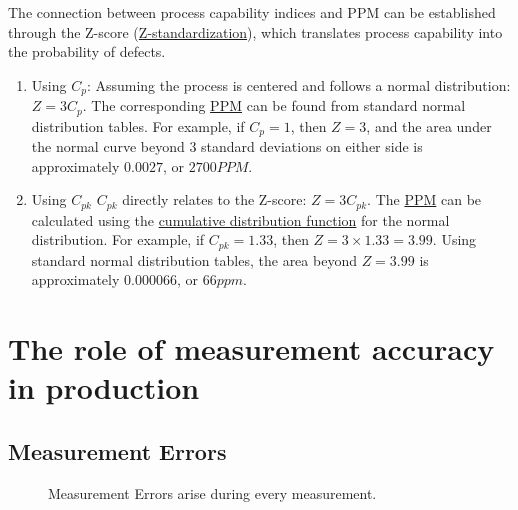 \documentclass[
  a4paper,
]{scrbook}
\begin{document}
The connection between process capability indices and PPM can be
established through the Z-score (\hyperref[Z]{Z-standardization}), which
translates process capability into the probability of defects.

\begin{enumerate}
\def\labelenumi{\arabic{enumi}.}
\item
  Using \(C_p\): Assuming the process is centered and follows a normal
  distribution: \(Z = 3C_p\). The corresponding \hyperref[ppm]{PPM} can
  be found from standard normal distribution tables. For example, if
  \(C_p = 1\), then \(Z = 3\), and the area under the normal curve
  beyond \(3\) standard deviations on either side is approximately
  \(0.0027\), or \(2700PPM\).
\item
  Using \(C_{pk}\) \(C_{pk}\) directly relates to the Z-score:
  \(Z = 3C_{pk}\). The \hyperref[ppm]{PPM} can be calculated using the
  \hyperref[cdf]{cumulative distribution function} for the normal
  distribution. For example, if \(C_{pk} = 1.33\), then
  \(Z = 3 \times 1.33 = 3.99\). Using standard normal distribution
  tables, the area beyond \(Z = 3.99\) is approximately \(0.000066\), or
  \(66ppm\).
\end{enumerate}

\section{The role of measurement accuracy in
production}\label{the-role-of-measurement-accuracy-in-production}

\subsection{Measurement Errors}\label{measurement-errors}

\begin{figure}[ht]


\caption{\label{fig-measurement-error}Measurement Errors arise during
every measurement.}

\end{figure}%
\end{document}
